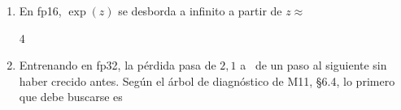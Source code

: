 \begin{enumerate}[label=\textbf{\arabic*.},leftmargin=2em,itemsep=8pt,ref=\arabic*]
\item\label{q:19}  En fp16, $\exp(z)$ se desborda a infinito a partir de $z\approx$
\begin{multicols}{4}
\end{multicols}

\item\label{q:20}  Entrenando en fp32, la pérdida pasa de $2{,}1$ a \NaN\ de un paso al siguiente sin haber crecido antes. Según el árbol de diagnóstico de M11, §6.4, lo primero que debe buscarse es

\end{enumerate}
